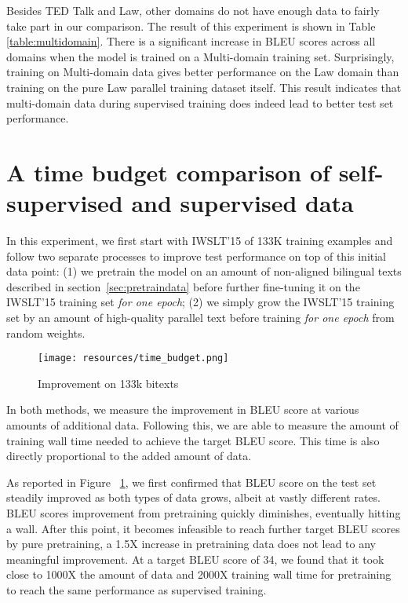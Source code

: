 \documentclass[11pt]{article}
\begin{document}
Besides TED Talk and Law, other domains do not have enough data to fairly take part in our comparison.
The result of this experiment is shown in Table \ref{table:multidomain}. There is a significant increase in BLEU scores across all domains when the model is trained on a Multi-domain training set. Surprisingly, training on Multi-domain data gives better performance on the Law domain than training on the pure Law parallel training dataset itself. 
This result indicates that multi-domain data during supervised training does indeed lead to better test set performance. 

\section{A time budget comparison of self-supervised and supervised data}
In this experiment, we first start with IWSLT'15 of 133K training examples and follow two separate processes to improve test performance on top of this initial data point: (1) we pretrain the model on an amount of non-aligned bilingual texts described in section~\ref{sec:pretraindata} before further fine-tuning it on the IWSLT'15 training set {\it for one epoch}; (2) we simply grow the IWSLT'15 training set by an amount of high-quality parallel text before training {\it for one epoch} from random weights.

\begin{figure}[ht!]
\centerline{\texttt{[image: resources/time\_budget.png]}}
\caption{Improvement on 133k bitexts}
    \label{fig:coord}
\end{figure}

In both methods, we measure the improvement in BLEU score at various amounts of additional data. Following this, we are able to measure the amount of training wall time needed to achieve the target BLEU score. This time is also directly proportional to the added amount of data. 

As reported in Figure ~\ref{fig:coord}, we first confirmed that BLEU score on the test set steadily improved as both types of data grows, albeit at vastly different rates. 
BLEU scores improvement from pretraining quickly diminishes, eventually hitting a wall. After this point, it becomes infeasible to reach further target BLEU scores by pure pretraining, a 1.5X increase in pretraining data does not lead to any meaningful improvement. At a target BLEU score of 34, we found that it took close to 1000X the amount of data and 2000X training wall time for pretraining to reach the same performance as supervised training.
\end{document}
